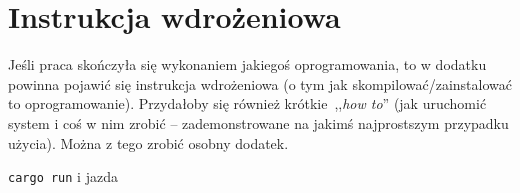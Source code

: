 \chapter{Instrukcja wdrożeniowa}
Jeśli praca skończyła się wykonaniem jakiegoś oprogramowania, to w dodatku powinna pojawić się instrukcja wdrożeniowa (o tym jak skompilować/zainstalować to oprogramowanie).
Przydałoby się również krótkie~,,\emph{how to}'' (jak uruchomić system i coś w nim zrobić -- zademonstrowane na jakimś najprostszym przypadku użycia). Można z tego zrobić osobny dodatek.

\noindent
\texttt{cargo run} i jazda
